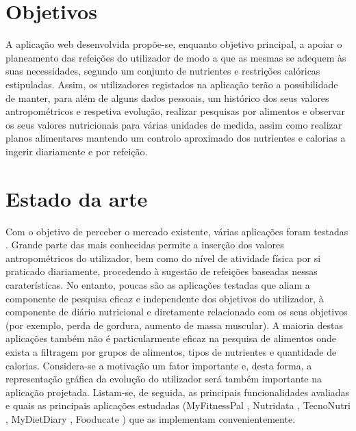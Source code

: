 \documentclass[twocolumn,twoside,11pt,a4paper]{article}
\begin{document}
\section{Objetivos}
A aplicação web desenvolvida propõe-se, enquanto objetivo principal, a apoiar o planeamento das refeições do utilizador de modo a que as mesmas se adequem às suas necessidades, segundo um conjunto de nutrientes e restrições calóricas estipuladas.  Assim, os utilizadores registados na aplicação terão a possibilidade de manter, para além de alguns dados pessoais, um histórico dos seus valores antropométricos e respetiva evolução, realizar pesquisas por alimentos e observar os seus valores nutricionais para várias unidades de medida, assim como realizar planos alimentares mantendo um controlo aproximado dos nutrientes e calorias a ingerir diariamente e por refeição.


\section{Estado da arte}
Com o objetivo de perceber o mercado existente, várias aplicações foram testadas \cite{apps}. Grande parte das mais conhecidas permite a inserção dos valores antropométricos do utilizador, bem como do nível de atividade física por si praticado diariamente, procedendo à sugestão de refeições baseadas nessas caraterísticas. No entanto, poucas são as aplicações testadas que aliam a componente de pesquisa eficaz e independente dos objetivos do utilizador, à componente de diário nutricional e diretamente relacionado com os seus objetivos (por exemplo, perda de gordura, aumento de massa muscular). A maioria destas aplicações também não é particularmente eficaz na pesquisa de alimentos onde exista a filtragem por grupos de alimentos, tipos de nutrientes e quantidade de calorias. Considera-se a motivação um fator importante e, desta forma, a representação gráfica da evolução do utilizador será também importante na aplicação projetada. 
Listam-se, de seguida, as principais funcionalidades avaliadas e quais as principais aplicações estudadas (MyFitnessPal \cite{myfitnesspal}, Nutridata \cite{nutridata}, TecnoNutri \cite{tecnonutri}, MyDietDiary \cite{mydietdiary}, Fooducate \cite{fooducate}) que as implementam convenientemente.
\end{document}
